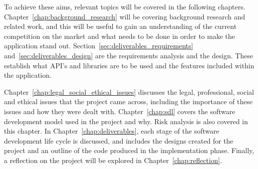 	    To achieve these aims, relevant topics will be covered in the following chapters.  Chapter~\ref{chap:background_research} will be covering background research and related work, and this will be useful to gain an understanding of the current competition on the market and what needs to be done in order to make the application stand out.  Section~\ref{sec:deliverables_requirements} and~\ref{sec:deliverables_design} are the requirements analysis and the design. These establish what API's and libraries are to be used and the features included within the application.
	    
	    Chapter~\ref{chap:legal_social_ethical_issues} discusses the legal, professional, social and ethical issues that the project came across, including the importance of these issues and how they were dealt with.  Chapter~\ref{chap:sdl} covers the software development model used in the project and why.  Risk analysis is also covered in this chapter.  In Chapter~\ref{chap:deliverables}, each stage of the software development life cycle is discussed, and includes the designs created for the project and an outline of the code produced in the implementation phase.  Finally, a reflection on the project will be explored in Chapter~\ref{chap:reflection}.
	    